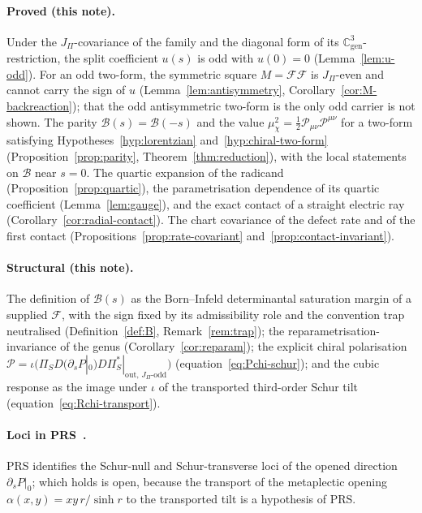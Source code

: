\documentclass[11pt]{article}
\theoremstyle{definition}
\theoremstyle{remark}
\newcommand{\JPi}{J_{\Pi}}
\newcommand{\Fchi}{\mathcal{F}}
\newcommand{\Pchi}{\mathcal{P}}
\newcommand{\Bsat}{\mathcal{B}}
\newcommand{\Cgen}{\mathbb{C}^{3}_{\mathrm{gen}}}
\newcommand{\muchi}{\mu_{\chi}^{2}}
\begin{document}
    \paragraph{Proved (this note).}
      Under the $\JPi$-covariance of the family and the diagonal form of its $\Cgen$-restriction, the split coefficient $u(s)$ is odd with $u(0) = 0$
      (Lemma~\ref{lem:u-odd}).
      For an odd two-form, the symmetric square $M = \Fchi \Fchi$ is $\JPi$-even and cannot carry the sign of $u$
      (Lemma~\ref{lem:antisymmetry}, Corollary~\ref{cor:M-backreaction}); that the odd antisymmetric two-form is the
      only odd carrier is not shown.
      The parity $\Bsat(s)=\Bsat(-s)$ and the value $\muchi=\tfrac12\Pchi_{\mu\nu}\Pchi^{\mu\nu}$ for a two-form
      satisfying Hypotheses~\ref{hyp:lorentzian} and~\ref{hyp:chiral-two-form}
      (Proposition~\ref{prop:parity}, Theorem~\ref{thm:reduction}), with the local statements on $\Bsat$ near $s=0$.
      The quartic expansion of the radicand (Proposition~\ref{prop:quartic}), the parametrisation dependence of its
      quartic coefficient (Lemma~\ref{lem:gauge}), and the exact contact of a straight electric ray
      (Corollary~\ref{cor:radial-contact}).
      The chart covariance of the defect rate and of the first contact (Propositions~\ref{prop:rate-covariant}
      and~\ref{prop:contact-invariant}).

    \paragraph{Structural (this note).}
      The definition of $\Bsat(s)$ as the Born--Infeld determinantal saturation margin of a supplied $\Fchi$, with the
      sign fixed by its admissibility role and the convention trap neutralised (Definition~\ref{def:B},
      Remark~\ref{rem:trap}); the reparametrisation-invariance of the genus (Corollary~\ref{cor:reparam}); the explicit
      chiral polarisation
      $\Pchi = \iota\big(\Pi_S D (\partial_s P|_{0}) D \Pi_S^*|_{\mathrm{out},\,\JPi\text{-odd}}\big)$
      (equation~\eqref{eq:Pchi-schur}); and the cubic response as the image under $\iota$ of the transported
      third-order Schur tilt (equation~\eqref{eq:Rchi-transport}).

    \paragraph{Loci in PRS~\cite{Beau2026prs}.}
      PRS identifies the Schur-null and Schur-transverse loci of the opened direction $\partial_s P|_{0}$; which holds
      is
      open, because the transport of the metaplectic opening $\alpha(x,y)=xy\,r/\sinh r$ to the transported tilt is a
      hypothesis of PRS.
\end{document}
